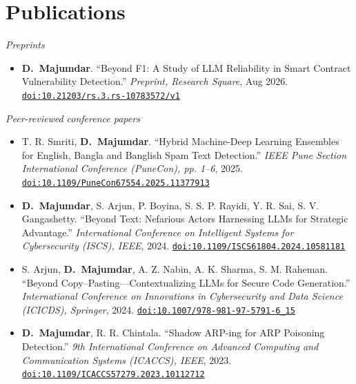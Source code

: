 \documentclass[10pt]{article}
\newcommand{\doi}[1]{\href{https://doi.org/#1}{\nolinkurl{doi:#1}}}
\begin{document}
\section{Publications}
\textit{Preprints}
\begin{itemize}
  \item \textbf{D.~Majumdar}. ``Beyond F1: A Study of LLM Reliability in Smart Contract Vulnerability Detection.'' \emph{Preprint, Research Square}, Aug 2026. \doi{10.21203/rs.3.rs-10783572/v1}
\end{itemize}
\vspace{0.2em}
\textit{Peer-reviewed conference papers}
\begin{itemize}
  \item T. R. Smriti, \textbf{D.~Majumdar}. ``Hybrid Machine-Deep Learning Ensembles for English, Bangla and Banglish Spam Text Detection.'' \emph{IEEE Pune Section International Conference (PuneCon), pp. 1--6}, 2025. \doi{10.1109/PuneCon67554.2025.11377913}
  \item \textbf{D.~Majumdar}, S. Arjun, P. Boyina, S. S. P. Rayidi, Y. R. Sai, S. V. Gangashetty. ``Beyond Text: Nefarious Actors Harnessing LLMs for Strategic Advantage.'' \emph{International Conference on Intelligent Systems for Cybersecurity (ISCS), IEEE}, 2024. \doi{10.1109/ISCS61804.2024.10581181}
  \item S. Arjun, \textbf{D.~Majumdar}, A. Z. Nabin, A. K. Sharma, S. M. Raheman. ``Beyond Copy–Pasting—Contextualizing LLMs for Secure Code Generation.'' \emph{International Conference on Innovations in Cybersecurity and Data Science (ICICDS), Springer}, 2024. \doi{10.1007/978-981-97-5791-6\_15}
  \item \textbf{D.~Majumdar}, R. R. Chintala. ``Shadow ARP-ing for ARP Poisoning Detection.'' \emph{9th International Conference on Advanced Computing and Communication Systems (ICACCS), IEEE}, 2023. \doi{10.1109/ICACCS57279.2023.10112712}
\end{itemize}
\end{document}
